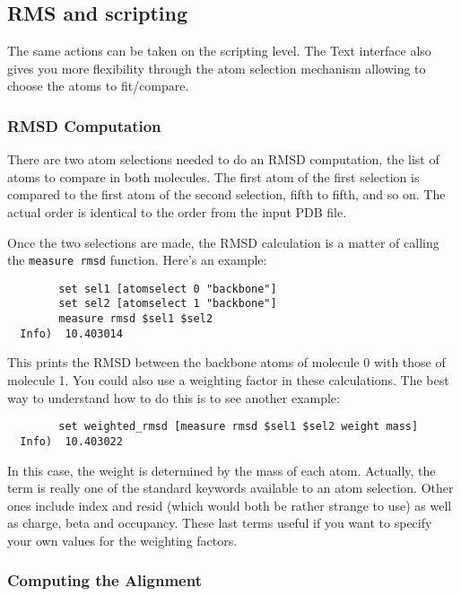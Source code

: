 \subsection{RMS and scripting}
\label{ug:scripts:rmsd}

The same actions can be taken on the scripting level. The Text interface 
also gives you more flexibility through the atom selection mechanism
allowing to choose the atoms to fit/compare.

\subsubsection{RMSD Computation}
There are two atom selections needed to do an RMSD computation, the
list of atoms to compare in both molecules.  The first atom of the
first selection is compared to the first atom of the second selection,
fifth to fifth, and so on.  The actual order is identical to the order
from the input PDB file.

Once the two selections are made, the RMSD calculation is a matter of
calling the {\tt measure rmsd} function.  Here's an example:
{\tt \begin{verbatim}
        set sel1 [atomselect 0 "backbone"]
        set sel2 [atomselect 1 "backbone"]
        measure rmsd $sel1 $sel2
  Info)  10.403014
\end{verbatim}}
This prints the RMSD between the backbone atoms of molecule 0 with
those of molecule 1.  You could also use a weighting factor in these
calculations.  The best way to understand how to do this is to see
another example:
{\tt \begin{verbatim}
        set weighted_rmsd [measure rmsd $sel1 $sel2 weight mass]
  Info)  10.403022
\end{verbatim}}

In this case, the weight is determined by the mass of each atom.
Actually, the term is really one of the standard keywords available to
an atom selection.  Other ones include index and resid (which would
both be rather strange to use) as well as charge, beta and occupancy.
These last terms useful if you want to specify your own values for the
weighting factors.

\subsubsection{Computing the Alignment}

